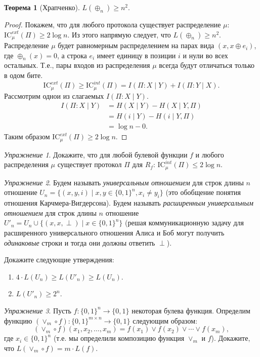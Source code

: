 \documentclass[12pt]{article}
\newcommand{\bits}{\{0,1\}}
\newcommand{\seqn}[2]{{#1}_1,{#1}_2,\dotsc,{#1}_{#2}}
\newcommand{\IC}{\mathrm{IC}}
\theoremstyle{definition}
\theoremstyle{plain}
\newtheorem{theorem}{Теорема}[section]
\theoremstyle{remark}
\newtheorem{exercise}{Упражнение}[section]
\begin{document}
\begin{theorem}[Храпченко]
    $L(\oplus_n)\ge n^2.$
\end{theorem}
\begin{proof}
    Покажем, что для любого протокола существует распределение $\mu$: $\IC^{ext}_\mu(\Pi)\ge 2\log n$.
    Из этого напрямую следует, что $L(\oplus_n)\ge n^2$.
    Распределение $\mu$ будет равномерным распределением на парах вида $(x,x\oplus e_i)$,
    где $\oplus_n(x) = 0$, а строка $e_i$ имеет единицу в позиции $i$ и нули во всех остальных. 
    Т.е., пары входов из распределения $\mu$ всегда будут отличаться только в одом бите.
    \[
        \IC_\mu^{ext}(\Pi) 
        \ge \IC_\mu^{int}(\Pi)  
         = I(\Pi:X\mid Y) + I(\Pi:Y\mid X).
    \]
    Рассмотрим однои из слагаемых $I(\Pi:X\mid Y)$.
    \[\begin{aligned}
        I(\Pi:X\mid Y) &= H(X\mid Y) - H(X\mid Y,\Pi)\\
                       &= H(i\mid Y) - H(i\mid Y,\Pi)\\
                       &= \log n - 0.
    \end{aligned}\]
    Таким образом $\IC_\mu^{ext}(\Pi) \ge 2\log n$.
\end{proof}
\begin{exercise}
    Докажите, что для любой булевой функции $f$ и любого распределения $\mu$
    существует протокол $\Pi$ для $R_f$: $\IC^{int}_\mu(\Pi) \le 2\log n$.
\end{exercise}
\begin{exercise}
    Будем называть \emph{универсальным отношением} для строк длины $n$ отношение 
    $U_n = \{(x,y,i) \mid x,y\in\bits^n, x_i\neq y_i\}$ (это обобщение понятия
    отношения Карчмера-Вигдерсона). Будем называть \emph{расширенным универсальным
    отношением} для строк длины $n$ отношение $U'_n = U_n\cup \{(x,x,\perp)\mid x\in\bits^n\}$
    (решая коммуникационную задачу для расширенного универсального отношения
    Алиса и Боб могут получить \emph{одинаковые} строки и тогда они должны ответить $\perp$).

    Докажите следующие утверждения:
    \begin{enumerate}
        \item $4\cdot L(U_n) \ge L(U'_n) \ge L(U_n)$.
        \item $L(U'_n) \ge 2^n$.
    \end{enumerate}
\end{exercise}
\begin{exercise}
    Пусть $f:\bits^n\to\bits$ некоторая булева функция. Определим функцию $(\lor_m\circ f): \bits^{m\times n}\to\bits$
    следующим образом: $$(\lor_m\circ f)(\seqn{x}{m}) = f(x_1)\lor f(x_2)\lor \dotsb\lor f(x_m),$$
    где $x_i\in\bits^n$ (т.е. мы определили композицию функция $\lor_m$ и $f$). Докажите, что $L(\lor_m\circ f) =
    m\cdot L(f)$. 
\end{exercise}
\end{document}
